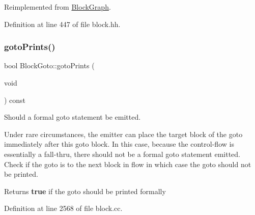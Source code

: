 Reimplemented from \mbox{\hyperlink{class_block_graph_a8e542e109e0acc977218ceaf3c248153}{Block\+Graph}}.



Definition at line 447 of file block.\+hh.

\mbox{\label{class_block_goto_a2c4cc4dddc9aac456e0b439dc7a2ad1f}} 
\subsubsection{\texorpdfstring{gotoPrints()}{gotoPrints()}}
{\footnotesize\ttfamily bool Block\+Goto\+::goto\+Prints (\begin{DoxyParamCaption}\item[{void}]{ }\end{DoxyParamCaption}) const}



Should a formal goto statement be emitted. 

Under rare circumstances, the emitter can place the target block of the goto immediately after this goto block. In this case, because the control-\/flow is essentially a fall-\/thru, there should not be a formal goto statement emitted. Check if the goto is to the next block in flow in which case the goto should not be printed. \begin{DoxyReturn}{Returns}
{\bfseries{true}} if the goto should be printed formally 
\end{DoxyReturn}


Definition at line 2568 of file block.\+cc.


